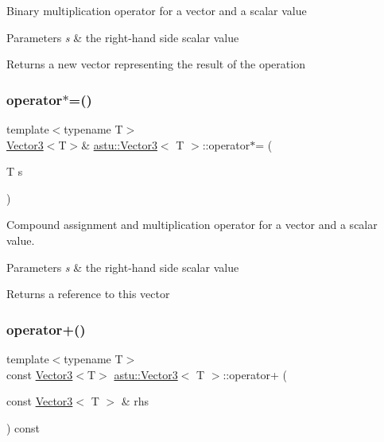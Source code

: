 Binary multiplication operator for a vector and a scalar value


\begin{DoxyParams}{Parameters}
{\em s} & the right-\/hand side scalar value \\
\hline
\end{DoxyParams}
\begin{DoxyReturn}{Returns}
a new vector representing the result of the operation 
\end{DoxyReturn}
\mbox{\label{classastu_1_1Vector3_ae67ab494d97f1be0cad3a638e12320f5}} 
\subsubsection{\texorpdfstring{operator$\ast$=()}{operator*=()}}
{\footnotesize\ttfamily template$<$typename T$>$ \\
\hyperlink{classastu_1_1Vector3}{Vector3}$<$T$>$\& \hyperlink{classastu_1_1Vector3}{astu\+::\+Vector3}$<$ T $>$\+::operator$\ast$= (\begin{DoxyParamCaption}\item[{T}]{s }\end{DoxyParamCaption})\hspace{0.3cm}{\ttfamily [inline]}}

Compound assignment and multiplication operator for a vector and a scalar value.


\begin{DoxyParams}{Parameters}
{\em s} & the right-\/hand side scalar value \\
\hline
\end{DoxyParams}
\begin{DoxyReturn}{Returns}
a reference to this vector 
\end{DoxyReturn}
\mbox{\label{classastu_1_1Vector3_a604044fcf4081d41647ed31952c2316c}} 
\subsubsection{\texorpdfstring{operator+()}{operator+()}}
{\footnotesize\ttfamily template$<$typename T$>$ \\
const \hyperlink{classastu_1_1Vector3}{Vector3}$<$T$>$ \hyperlink{classastu_1_1Vector3}{astu\+::\+Vector3}$<$ T $>$\+::operator+ (\begin{DoxyParamCaption}\item[{const \hyperlink{classastu_1_1Vector3}{Vector3}$<$ T $>$ \&}]{rhs }\end{DoxyParamCaption}) const\hspace{0.3cm}{\ttfamily [inline]}}


